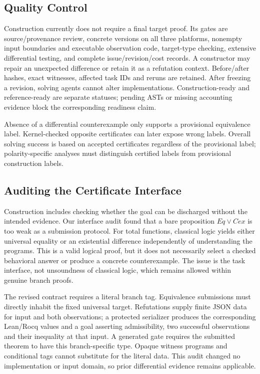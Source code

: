 \documentclass{article}
\begin{document}
\subsection{Quality Control}

Construction currently does not require a final target proof. Its gates are source/provenance review, concrete versions on all three platforms, nonempty input boundaries and executable observation code, target-type checking, extensive differential testing, and complete issue/revision/cost records. A constructor may repair an unexpected difference or retain it as a refutation context. Before/after hashes, exact witnesses, affected task IDs and reruns are retained. After freezing a revision, solving agents cannot alter implementations. Construction-ready and reference-ready are separate statuses; pending ASTs or missing accounting evidence block the corresponding readiness claim.

Absence of a differential counterexample only supports a provisional equivalence label. Kernel-checked opposite certificates can later expose wrong labels. Overall solving success is based on accepted certificates regardless of the provisional label; polarity-specific analyses must distinguish certified labels from provisional construction labels.

\subsection{Auditing the Certificate Interface}

Construction includes checking whether the goal can be discharged without the intended evidence. Our interface audit found that a bare proposition $\mathit{Eq}\lor\mathit{Cex}$ is too weak as a submission protocol. For total functions, classical logic yields either universal equality or an existential difference independently of understanding the programs. This is a valid logical proof, but it does not necessarily select a checked behavioral answer or produce a concrete counterexample. The issue is the task interface, not unsoundness of classical logic, which remains allowed within genuine branch proofs.

The revised contract requires a literal branch tag. Equivalence submissions must directly inhabit the fixed universal target. Refutations supply finite JSON data for input and both observations; a protected serializer produces the corresponding Lean/Rocq values and a goal asserting admissibility, two successful observations and their inequality at that input. A generated gate requires the submitted theorem to have this branch-specific type. Opaque witness programs and conditional tags cannot substitute for the literal data. This audit changed no implementation or input domain, so prior differential evidence remains applicable.
\end{document}
